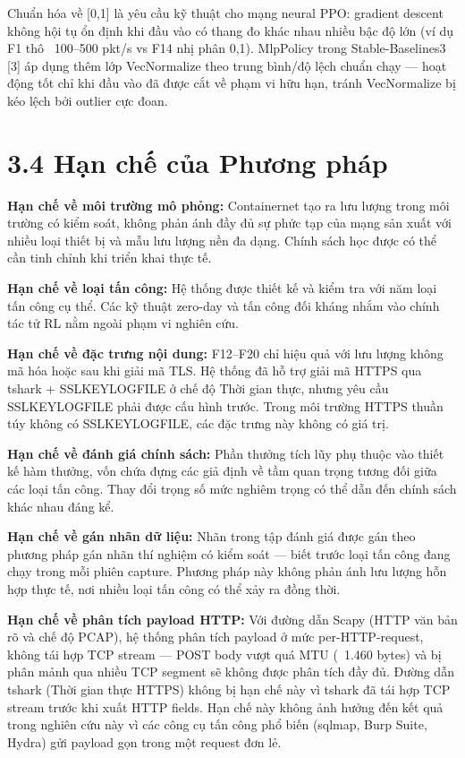 \documentclass[12pt,a4paper,twoside]{report}
\begin{document}
{{Chuẩn hóa về [0,1] là yêu cầu kỹ thuật cho mạng neural PPO: gradient descent không hội tụ ổn định khi đầu vào có thang đo khác nhau nhiều bậc độ lớn (ví dụ F1 thô ~100–500 pkt/s vs F14 nhị phân {0,1}). MlpPolicy trong Stable-Baselines3 [3] áp dụng thêm lớp VecNormalize theo trung bình/độ lệch chuẩn chạy — hoạt động tốt chỉ khi đầu vào đã được cắt về phạm vi hữu hạn, tránh VecNormalize bị kéo lệch bởi outlier cực đoan.


\section{3.4 Hạn chế của Phương pháp}

\textbf{Hạn chế về môi trường mô phỏng:} Containernet tạo ra lưu lượng trong môi trường có kiểm soát, không phản ánh đầy đủ sự phức tạp của mạng sản xuất với nhiều loại thiết bị và mẫu lưu lượng nền đa dạng. Chính sách học được có thể cần tinh chỉnh khi triển khai thực tế.

\textbf{Hạn chế về loại tấn công:} Hệ thống được thiết kế và kiểm tra với năm loại tấn công cụ thể. Các kỹ thuật zero-day và tấn công đối kháng nhắm vào chính tác tử RL nằm ngoài phạm vi nghiên cứu.

\textbf{Hạn chế về đặc trưng nội dung:} F12–F20 chỉ hiệu quả với lưu lượng không mã hóa hoặc sau khi giải mã TLS. Hệ thống đã hỗ trợ giải mã HTTPS qua tshark + SSLKEYLOGFILE ở chế độ Thời gian thực, nhưng yêu cầu SSLKEYLOGFILE phải được cấu hình trước. Trong môi trường HTTPS thuần túy không có SSLKEYLOGFILE, các đặc trưng này không có giá trị.

\textbf{Hạn chế về đánh giá chính sách:} Phần thưởng tích lũy phụ thuộc vào thiết kế hàm thưởng, vốn chứa đựng các giả định về tầm quan trọng tương đối giữa các loại tấn công. Thay đổi trọng số mức nghiêm trọng có thể dẫn đến chính sách khác nhau đáng kể.

\textbf{Hạn chế về gán nhãn dữ liệu:} Nhãn trong tập đánh giá được gán theo phương pháp gán nhãn thí nghiệm có kiểm soát — biết trước loại tấn công đang chạy trong mỗi phiên capture. Phương pháp này không phản ánh lưu lượng hỗn hợp thực tế, nơi nhiều loại tấn công có thể xảy ra đồng thời.

\textbf{Hạn chế về phân tích payload HTTP:} Với đường dẫn Scapy (HTTP văn bản rõ và chế độ PCAP), hệ thống phân tích payload ở mức per-HTTP-request, không tái hợp TCP stream — POST body vượt quá MTU (~1.460 bytes) và bị phân mảnh qua nhiều TCP segment sẽ không được phân tích đầy đủ. Đường dẫn tshark (Thời gian thực HTTPS) không bị hạn chế này vì tshark đã tái hợp TCP stream trước khi xuất HTTP fields. Hạn chế này không ảnh hưởng đến kết quả trong nghiên cứu này vì các công cụ tấn công phổ biến (sqlmap, Burp Suite, Hydra) gửi payload gọn trong một request đơn lẻ.


}}
\end{document}
